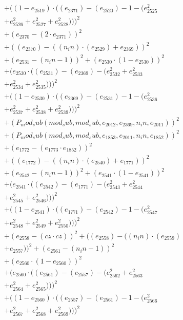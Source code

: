 \documentclass[10pt, a4paper]{article}
\begin{document}
\begin{align*}
& + ((1 - e_{2519})  \cdot  ((e_{2371}) - (e_{2520}) - 1 - (e_{2525}^{2} \\
& + e_{2526}^{2} + e_{2527}^{2} + e_{2528}^{2})))^{2} \\
& + (e_{2370} - (2  \cdot  e_{2371}))^{2} \\
& + ((e_{2370}) - ((n_in)  \cdot  (e_{2529}) + e_{2369}))^{2} \\
& + (e_{2531} - (n_in - 1))^{2} + (e_{2530}  \cdot  (1 - e_{2530}))^{2} \\
& + (e_{2530}  \cdot  ((e_{2531}) - (e_{2369}) - (e_{2532}^{2} + e_{2533}^{2} \\
& + e_{2534}^{2} + e_{2535}^{2})))^{2} \\
& + ((1 - e_{2530})  \cdot  ((e_{2369}) - (e_{2531}) - 1 - (e_{2536}^{2} \\
& + e_{2537}^{2} + e_{2538}^{2} + e_{2539}^{2})))^{2} \\
& + (P_mod_sub(mod_sub, mod_sub, e_{2012}, e_{2369}, n_in, e_{2011}))^{2} \\
& + (P_mod_sub(mod_sub, mod_sub, e_{1853}, e_{2011}, n_in, e_{1852}))^{2} \\
& + (e_{1772} - (e_{1773}  \cdot  e_{1852}))^{2} \\
& + ((e_{1772}) - ((n_in)  \cdot  (e_{2540}) + e_{1771}))^{2} \\
& + (e_{2542} - (n_in - 1))^{2} + (e_{2541}  \cdot  (1 - e_{2541}))^{2} \\
& + (e_{2541}  \cdot  ((e_{2542}) - (e_{1771}) - (e_{2543}^{2} + e_{2544}^{2} \\
& + e_{2545}^{2} + e_{2546}^{2})))^{2} \\
& + ((1 - e_{2541})  \cdot  ((e_{1771}) - (e_{2542}) - 1 - (e_{2547}^{2} \\
& + e_{2548}^{2} + e_{2549}^{2} + e_{2550}^{2})))^{2} \\
& + (e_{2558} - (cz  \cdot  cz))^{2} + ((e_{2558}) - ((n_in)  \cdot  (e_{2559}) \\
& + e_{2557}))^{2} + (e_{2561} - (n_in - 1))^{2} \\
& + (e_{2560}  \cdot  (1 - e_{2560}))^{2} \\
& + (e_{2560}  \cdot  ((e_{2561}) - (e_{2557}) - (e_{2562}^{2} + e_{2563}^{2} \\
& + e_{2564}^{2} + e_{2565}^{2})))^{2} \\
& + ((1 - e_{2560})  \cdot  ((e_{2557}) - (e_{2561}) - 1 - (e_{2566}^{2} \\
& + e_{2567}^{2} + e_{2568}^{2} + e_{2569}^{2})))^{2} \\

\end{align*}
\end{document}

